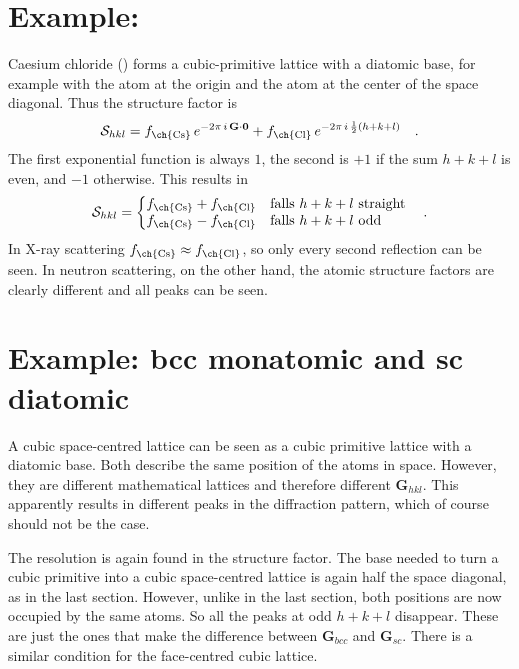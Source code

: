 \section{Example: }

Caesium chloride () forms a cubic-primitive lattice with a diatomic base, for example with the  atom at the origin and the  atom at the center of the space diagonal. Thus the structure factor is 
\begin{equation}
\mathcal{S}_{hkl} = f_\text{\ch{Cs}} \, e^{-2 \pi \, i \, \mathbf{G} \cdot \mathbf{0}} + f_\text{\ch{Cl}} \, e^{- 2 \pi \, i \, \frac{1}{2}(h + k + l) }   \quad .
\end{equation}
The first exponential function is always $1$, the second is $+1$ if the sum $h + k + l$ is even, and $-1$ otherwise. This results in
\begin{equation}
  \mathcal{S}_{hkl} = \left\{
  \begin{array}{@{}ll@{}}
    f_\text{\ch{Cs}}  + f_\text{\ch{Cl}}  &\text{falls}\ h+k+l \ \text{straight} \\
     f_\text{\ch{Cs}}  - f_\text{\ch{Cl}} & \text{falls}\ h+k+l \ \text{odd} \\
  \end{array}\right.  \quad .
\end{equation} 
In X-ray scattering $f_\text{\ch{Cs}}  \approx f_\text{\ch{Cl}}$, so only every second reflection can be seen. In neutron scattering, on the other hand, the atomic structure factors are clearly different and all peaks can be seen.



\section{Example: bcc monatomic and sc diatomic}

A cubic space-centred lattice can be seen as a cubic primitive lattice with a diatomic base. Both describe the same position of the atoms in space. However, they are different mathematical lattices and therefore different $\mathbf{G}_{hkl}$. This apparently results in different peaks in the diffraction pattern, which of course should not be the case.

The resolution is again found in the structure factor. The base needed to turn a cubic primitive into a cubic space-centred lattice is again half the space diagonal, as in the last section. However, unlike in the last section, both positions are now occupied by the same atoms. So all the peaks at odd $ h+k+l $ disappear. These are just the ones that make the difference between $\mathbf{G}_{bcc} $ and $\mathbf{G}_{sc} $. There is a similar condition for the face-centred cubic lattice.


